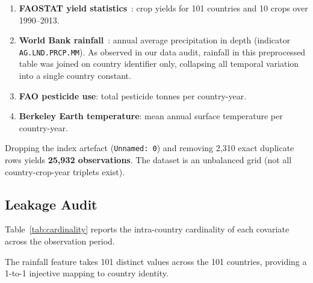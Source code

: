 \documentclass[conference]{IEEEtran}
\begin{document}
\begin{enumerate}
    \item \textbf{FAOSTAT yield statistics}~\cite{fao2021}: crop yields for 
    101 countries and 10 crops over 1990--2013.
    
    \item \textbf{World Bank rainfall}~\cite{worldbank2021}: annual average 
    precipitation in depth (indicator \texttt{AG.LND.PRCP.MM}). As observed 
    in our data audit, rainfall in this preprocessed table was joined on country 
    identifier only, collapsing all temporal variation into a single country constant.
    
    \item \textbf{FAO pesticide use}: total pesticide tonnes per country-year.
    
    \item \textbf{Berkeley Earth temperature}: mean annual surface temperature 
    per country-year.
\end{enumerate}

Dropping the index artefact (\texttt{Unnamed: 0}) and removing 2{,}310 exact 
duplicate rows yields \textbf{25{,}932 observations}. The dataset is an 
unbalanced grid (not all country-crop-year triplets exist).

\subsection{Leakage Audit}
\label{sec:audit}

Table~\ref{tab:cardinality} reports the intra-country cardinality of each 
covariate across the observation period.

\begin{table}[t]
\centering
\caption{Intra-Country Feature Cardinality}
\label{tab:cardinality}
\end{table}

The rainfall feature takes 101 distinct values across the 101 countries, 
providing a 1-to-1 injective mapping to country identity.
\end{document}
